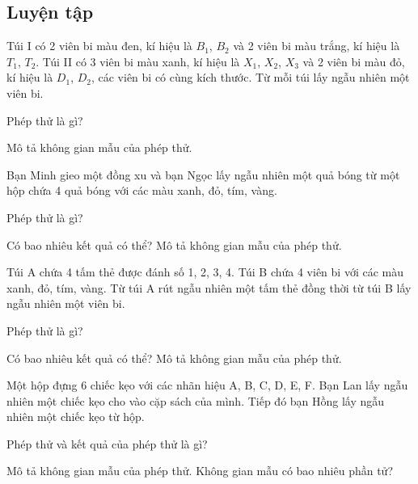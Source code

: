 \begin{practice}
    \subsection{Luyện tập}

    \begin{questions}[series=SBT]
        \item Túi I có 2 viên bi màu đen, kí hiệu là $B_1$, $B_2$ và 2 viên bi màu trắng, kí hiệu là $T_1$, $T_2$. Túi II có 3 viên bi màu xanh, kí hiệu là $X_1$, $X_2$, $X_3$ và 2 viên bi màu đỏ, kí hiệu là $D_1$, $D_2$, các viên bi có cùng kích thước. Từ mỗi túi lấy ngẫu nhiên một viên bi.
        \begin{questions}
            \item Phép thử là gì?
            \item Mô tả không gian mẫu của phép thử.
        \end{questions}

        \answerline
        \answerline

        \item Bạn Minh gieo một đồng xu và bạn Ngọc lấy ngẫu nhiên một quả bóng từ một hộp chứa 4 quả bóng với các màu xanh, đỏ, tím, vàng.
        \begin{questions}
            \item Phép thử là gì?
            \item Có bao nhiêu kết quả có thể? Mô tả không gian mẫu của phép thử.
        \end{questions}

        \answerline
        \answerline

        \item Túi A chứa 4 tấm thẻ được đánh số 1, 2, 3, 4. Túi B chứa 4 viên bi với các màu xanh, đỏ, tím, vàng. Từ túi A rút ngẫu nhiên một tấm thẻ đồng thời từ túi B lấy ngẫu nhiên một viên bi.
        \begin{questions}
            \item Phép thử là gì?
            \item Có bao nhiêu kết quả có thể? Mô tả không gian mẫu của phép thử.
        \end{questions}

        \answerline
        \answerline

        \item Một hộp đựng 6 chiếc kẹo với các nhãn hiệu A, B, C, D, E, F. Bạn Lan lấy ngẫu nhiên một chiếc kẹo cho vào cặp sách của mình. Tiếp đó bạn Hồng lấy ngẫu nhiên một chiếc kẹo từ hộp.
        \begin{questions}
            \item Phép thử và kết quả của phép thử là gì?
            \item Mô tả không gian mẫu của phép thử. Không gian mẫu có bao nhiêu phần tử?
        \end{questions}


\end{questions}
\end{practice}
